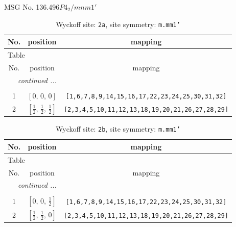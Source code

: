 \documentclass[fleqn,8pt]{jsarticle}
\begin{document}
\setcounter{MaxMatrixCols}{32}

\renewcommand{\tablename}{Table~}
\renewcommand{\figurename}{Figure~}
\begin{center}
\LARGE
MSG No. 136.496\quad$P4_{2}/mnm1'$
\end{center}
\renewcommand{\arraystretch}{1.2}
\begin{longtable}{ccc}
\caption{Wyckoff site: {\tt 2a}, site symmetry: {\tt m.mm1'}}
 \\
 \hline \hline
No. & position & mapping \\ \hline \endfirsthead

\multicolumn{2}{l}{\tablename\ \thetable{}} \\
 \hline \hline
No. & position & mapping \\ \hline \endhead

 \hline \hline
\multicolumn{2}{r}{\footnotesize\it continued ...} \\ \endfoot

 \hline \hline
\multicolumn{2}{r}{} \\ \endlastfoot

1 & $\left[ 0,\, 0,\, 0 \right]$ & {\tt [1,6,7,8,9,14,15,16,17,22,23,24,25,30,31,32]} \\ \hline
2 & $\left[ \frac{1}{2},\, \frac{1}{2},\, \frac{1}{2} \right]$ & {\tt [2,3,4,5,10,11,12,13,18,19,20,21,26,27,28,29]} \\
\end{longtable}
\renewcommand{\arraystretch}{1.2}
\begin{longtable}{ccc}
\caption{Wyckoff site: {\tt 2b}, site symmetry: {\tt m.mm1'}}
 \\
 \hline \hline
No. & position & mapping \\ \hline \endfirsthead

\multicolumn{2}{l}{\tablename\ \thetable{}} \\
 \hline \hline
No. & position & mapping \\ \hline \endhead

 \hline \hline
\multicolumn{2}{r}{\footnotesize\it continued ...} \\ \endfoot

 \hline \hline
\multicolumn{2}{r}{} \\ \endlastfoot

1 & $\left[ 0,\, 0,\, \frac{1}{2} \right]$ & {\tt [1,6,7,8,9,14,15,16,17,22,23,24,25,30,31,32]} \\ \hline
2 & $\left[ \frac{1}{2},\, \frac{1}{2},\, 0 \right]$ & {\tt [2,3,4,5,10,11,12,13,18,19,20,21,26,27,28,29]} \\
\end{longtable}
\end{document}
